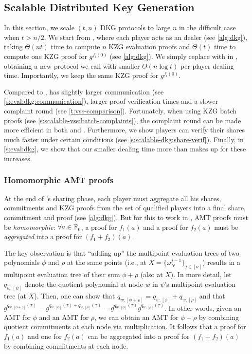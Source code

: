 \subsection{Scalable Distributed Key Generation}
\label{s:scalable-dkg}

In this section, we scale $(t,n)$ DKG protocols to large $n$ in the difficult case when $t > n/2$.
We start from \ejfdkg, where each player acts as an \evss dealer (see \cref{alg:dkg}), taking $\Theta(nt)$ time to compute $n$ KZG evaluation proofs and $\Theta(t)$ time to compute one KZG proof for $g^{f_i(0)}$ (see \cref{alg:dkg}).
We simply replace \evss with \ourvss in \ejfdkg, obtaining a new protocol we call \ourdkg with smaller $\Theta(n\log{t})$ per-player dealing time.
Importantly, we keep the same KZG proof for $g^{f_i(0)}$.

Compared to \ejfdkg, \ourdkg has slightly larger communication (see \cref{s:eval:dkg:communication}), larger proof verification times and a slower complaint round (see \cref{t:vss-comparison}).
Fortunately, when using KZG batch proofs (see \cref{s:scalable-vss:batch-complaints}), the complaint round can be made more efficient in both \ejfdkg and \ourdkg.
Furthermore, we show \ourdkg players can verify their shares much faster under certain conditions (see \cref{s:scalable-dkg:share-verif}).
Finally, in \cref{s:eval:dkg}, we show that our smaller dealing time more than makes up for these increases.

\subsubsection{Homomorphic AMT proofs}
\label{s:scalable-dkg:homomorphic-amt}
At the end of \ejfdkg's sharing phase, each player must aggregate all his shares, commitments and KZG proofs from the set of qualified players into a final share, commitment and proof (see \cref{alg:dkg}).
But for this to work in \ourdkg, AMT proofs must be \textit{homomorphic}: $\forall a\in\mathbb{F}_p$, a proof for $f_1(a)$ and a proof for $f_2(a)$ must be \textit{aggregated} into a proof for $(f_1+f_2)(a)$.

The key observation is that ``adding up'' the multipoint evaluation trees of two polynomials $\phi$ and $\rho$ at the same points (i.e., at $X=\{\omega_N^{j-1}\}_{j\in[n]}$) results in a multipoint evaluation tree of their sum $\phi+\rho$ (also at $X$).
In more detail, let $q_{w, [\psi]}$ denote the quotient polynomial at node $w$ in $\psi$'s multipoint evaluation tree (at $X$).
Then, one can show that $q_{w,[\phi+\rho]} = q_{w,[\phi]} + q_{w,[\rho]}$ and that $g^{q_{w,[\phi+\rho]}(\tau)} = g^{q_{w,[\phi]}(\tau) + q_{w,[\rho]}(\tau)} = g^{q_{w,[\phi]}(\tau)} g^{q_{w,[\rho]}(\tau)}$.
In other words, given an AMT for $\phi$ and an AMT for $\rho$, we can obtain an AMT for $\phi+\rho$ by combining quotient commitments at each node via multiplication.
It follows that a proof for $f_1(a)$ and one for $f_2(a)$ can be aggregated into a proof for $(f_1+f_2)(a)$ by combining commitments at each node.

